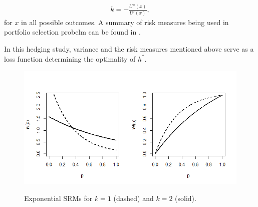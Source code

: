 \begin{align}
	k = -\frac{U''(x)}{U'(x)},
	\end{align}
for $x$ in all possible outcomes.
A summary of risk measures being used in portfolio selection probelm can be found in \citet{hardle2008applied}.\medskip

In this hedging study, variance and the risk measures mentioned above serve as a loss function determining the optimality
of $h^\ast$.

\begin{figure}[h]
	\begin{center}
		\includegraphics[scale = 0.7]{Figures/Fig1-1.png}\\
	\end{center}
	\caption{Exponential SRMs for $k=1$ (dashed) and $k=2$ (solid).}\label{Fig1:EPSRM}
\end{figure}
